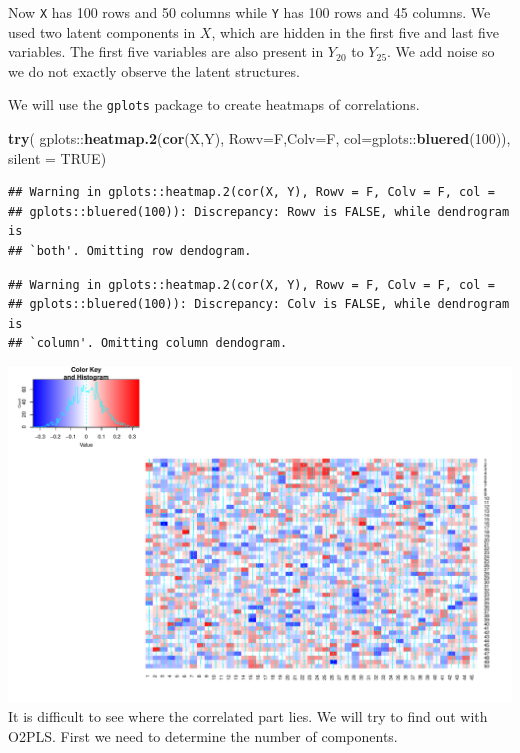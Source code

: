 \documentclass[]{article}
\newenvironment{Shaded}{\begin{snugshade}}{\end{snugshade}}
\newcommand{\KeywordTok}[1]{\textcolor[rgb]{0.13,0.29,0.53}{\textbf{{#1}}}}
\newcommand{\DataTypeTok}[1]{\textcolor[rgb]{0.13,0.29,0.53}{{#1}}}
\newcommand{\DecValTok}[1]{\textcolor[rgb]{0.00,0.00,0.81}{{#1}}}
\newcommand{\OtherTok}[1]{\textcolor[rgb]{0.56,0.35,0.01}{{#1}}}
\newcommand{\NormalTok}[1]{{#1}}
\begin{document}
Now \texttt{X} has 100 rows and 50 columns while \texttt{Y} has 100 rows
and 45 columns. We used two latent components in \(X\), which are hidden
in the first five and last five variables. The first five variables are
also present in \(Y_{20}\) to \(Y_{25}\). We add noise so we do not
exactly observe the latent structures.

We will use the \texttt{gplots} package to create heatmaps of
correlations.

\begin{Shaded}
\begin{Highlighting}[]
\KeywordTok{try}\NormalTok{(}
  \NormalTok{gplots::}\KeywordTok{heatmap.2}\NormalTok{(}\KeywordTok{cor}\NormalTok{(X,Y), }\DataTypeTok{Rowv=}\NormalTok{F,}\DataTypeTok{Colv=}\NormalTok{F, }\DataTypeTok{col=}\NormalTok{gplots::}\KeywordTok{bluered}\NormalTok{(}\DecValTok{100}\NormalTok{)),}
  \DataTypeTok{silent =} \OtherTok{TRUE}\NormalTok{)}
\end{Highlighting}
\end{Shaded}

\begin{verbatim}
## Warning in gplots::heatmap.2(cor(X, Y), Rowv = F, Colv = F, col =
## gplots::bluered(100)): Discrepancy: Rowv is FALSE, while dendrogram is
## `both'. Omitting row dendogram.
\end{verbatim}

\begin{verbatim}
## Warning in gplots::heatmap.2(cor(X, Y), Rowv = F, Colv = F, col =
## gplots::bluered(100)): Discrepancy: Colv is FALSE, while dendrogram is
## `column'. Omitting column dendogram.
\end{verbatim}

\includegraphics{Figs/unnamed-chunk-2-1.pdf} It is difficult to see
where the correlated part lies. We will try to find out with O2PLS.
First we need to determine the number of components.
\end{document}
